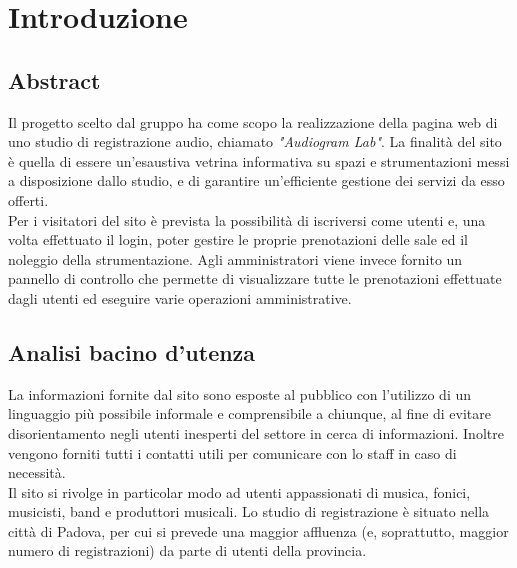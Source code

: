 \section{Introduzione}

\vspace{8px}

\subsection{Abstract}
Il progetto scelto dal gruppo ha come scopo la realizzazione della pagina web di uno studio di registrazione audio, chiamato \emph{"Audiogram Lab"}. La finalità del sito è quella di essere un'esaustiva vetrina informativa su spazi e strumentazioni messi a disposizione dallo studio, e di garantire un'efficiente gestione dei servizi da esso offerti.\\
Per i visitatori del sito è prevista la possibilità di iscriversi come utenti e, una volta effettuato il login, poter gestire le proprie prenotazioni delle sale ed il noleggio della strumentazione. Agli amministratori viene invece fornito un pannello di controllo che permette di visualizzare tutte le prenotazioni effettuate dagli utenti ed eseguire varie operazioni amministrative.

\vspace{8px}

\subsection{Analisi bacino d'utenza}
La informazioni fornite dal sito sono esposte al pubblico con l'utilizzo di un linguaggio più possibile informale e comprensibile a chiunque, al fine di evitare disorientamento negli utenti inesperti del settore in cerca di informazioni. Inoltre vengono forniti tutti i contatti utili per comunicare con lo staff in caso di necessità.\\
Il sito si rivolge in particolar modo ad utenti appassionati di musica, fonici, musicisti, band e produttori musicali. Lo studio di registrazione è situato nella città di Padova, per cui si prevede una maggior affluenza (e, soprattutto, maggior numero di registrazioni) da parte di utenti della provincia.
